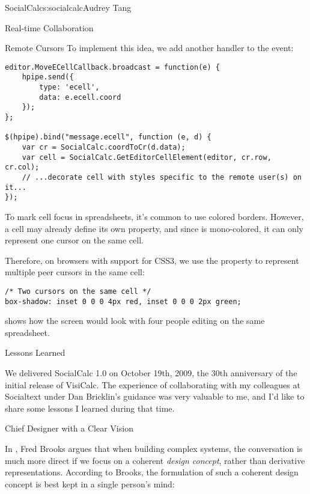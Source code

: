 \begin{aosachapter}{SocialCalc}{s:socialcalc}{Audrey Tang}
\begin{aosasect1}{Real-time Collaboration}
\begin{aosasect2}{Remote Cursors}
To implement this idea, we add another  handler to the
 event:

\begin{verbatim}
editor.MoveECellCallback.broadcast = function(e) {
    hpipe.send({
        type: 'ecell',
        data: e.ecell.coord
    });
};

$(hpipe).bind("message.ecell", function (e, d) {
    var cr = SocialCalc.coordToCr(d.data);
    var cell = SocialCalc.GetEditorCellElement(editor, cr.row, cr.col);
    // ...decorate cell with styles specific to the remote user(s) on it...
});
\end{verbatim}

To mark cell focus in spreadsheets, it's common to use colored
borders.  However, a cell may already define its own 
property, and since  is mono-colored, it can only
represent one cursor on the same cell.

Therefore, on browsers with support for CSS3, we use the 
property to represent multiple peer cursors in the same cell:

\begin{verbatim}
/* Two cursors on the same cell */
box-shadow: inset 0 0 0 4px red, inset 0 0 0 2px green;
\end{verbatim}

 shows how the screen would look with four
people editing on the same spreadsheet.


\end{aosasect2}

\end{aosasect1}

\begin{aosasect1}{Lessons Learned}

We delivered SocialCalc 1.0 on October 19th, 2009, the 30th
anniversary of the initial release of VisiCalc.  The experience of
collaborating with my colleagues at Socialtext under Dan Bricklin's
guidance was very valuable to me, and I'd like to share some lessons
I learned during that time.

\begin{aosasect2}{Chief Designer with a Clear Vision}

In \cite{bib:brooks:design}, Fred Brooks argues that when building
complex systems, the conversation is much more direct if we focus on a
coherent \emph{design concept}, rather than derivative
representations. According to Brooks, the formulation of such a
coherent design concept is best kept in a single person's mind:


\end{aosasect2}
\end{aosasect1}
\end{aosachapter}
